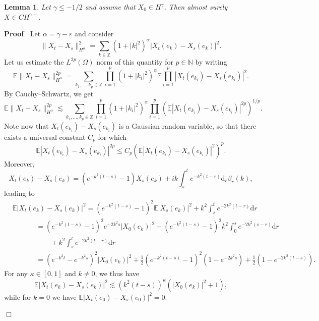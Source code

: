 \documentclass[a4paper,11pt]{article}
\newcommand{\mathd}{\mathrm{d}}
\newenvironment{proof}{\noindent\textbf{Proof\ }}{\hspace*{\fill}$\Box$\medskip}
\newtheorem{lemma}{Lemma}
{\theorembodyfont{\rmfamily}\newtheorem{remark}{Remark}}
\begin{document}
\begin{lemma}
  \label{lemma:ou-regularity}Let $\gamma \leqslant - 1 / 2$ and assume that
  $X_0 \in H^{\gamma}$. Then almost surely $X \in C H^{\gamma -}$.
\end{lemma}

\begin{proof}
  Let $\alpha = \gamma - \varepsilon$ and consider
  \[ \| X_t - X_s \|_{H^{\alpha}}^2 = \sum_{k \in \mathbb{Z}} (1 + | k
     |^2)^{\alpha} | X_t (e_k) - X_s (e_k) |^2 . \]
  Let us estimate the $L^{2 p} (\Omega)$ norm of this quantity for $p \in
  \mathbb{N}$ by writing
  \[ \mathbb{E} \| X_t - X_s \|_{H^{\alpha}}^{2 p} = \sum_{k_1, \ldots, k_p
     \in \mathbb{Z}} \prod_{i = 1}^p (1 + | k_i |^2)^{\alpha} \mathbb{E}
     \prod_{i = 1}^p | X_t (e_{k_i}) - X_s (e_{k_i}) |^2 . \]
  By Cauchy--Schwartz, we get
  \[ \mathbb{E} \| X_t - X_s \|_{H^{\alpha}}^{2 p} \lesssim \sum_{k_1,
     \ldots, k_p \in \mathbb{Z}} \prod_{i = 1}^p (1 + | k_i |^2)^{\alpha}
     \prod_{i = 1}^p (\mathbb{E} | X_t (e_{k_i}) - X_s (e_{k_i}) |^{2 p})^{1
     / p} . \]
  Note now that $X_t (e_{k_i}) - X_s (e_{k_i})$ is a Gaussian random variable,
  so that there exists a universal constant $C_p$ for which
  \[ \mathbb{E} | X_t (e_{k_i}) - X_s (e_{k_i}) |^{2 p} \leqslant C_p
     (\mathbb{E} | X_t (e_{k_i}) - X_s (e_{k_i}) |^2)^p . \]
  Moreover,
  \[ X_t (e_k) - X_s (e_k) = (e^{- k^2 (t - s)} - 1) X_s (e_k) + ik \int_s^t
     e^{- k^2 (t - r)} \mathd_r \beta_r (k), \]
  leading to
  \begin{align*}
     &\mathbb{E} | X_t (e_k) - X_s (e_k) |^2 = (e^{- k^2 (t - s)} - 1)^2 \mathbb{E} | X_s (e_k) |^2 + k^2 \int_s^t e^{- 2 k^2 (t - r)} \mathd r \\
     &\hspace{40pt} = (e^{- k^2 (t - s)} - 1)^2 e^{- 2 k^2 s} | X_0 (e_k) |^2 + (e^{- k^2 (t - s)} - 1)^2 k^2 \int_0^s e^{- 2 k^2 (s - r)} \mathd r  \\
     &\hspace{40pt} \qquad + k^2 \int_s^t e^{- 2 k^2 (t - r)} \mathd r \\
     &\hspace{40pt} = (e^{- k^2 t} - e^{- k^2 s})^2 | X_0 (e_k) |^2 + \frac{1}{2} (e^{- k^2 (t - s)} - 1)^2 (1 - e^{- 2 k^2 s}) + \frac{1}{2} (1 - e^{- 2 k^2 (t - s)}).
  \end{align*}
  For any $\kappa \in [0, 1]$ and $k \neq 0$, we thus have
  \[ \mathbb{E} | X_t (e_k) - X_s (e_k) |^2 \lesssim (k^2 (t - s))^{\kappa}
     (| X_0 (e_k) |^2 + 1), \]
  while for $k = 0$ we have $\mathbb{E} | X_t (e_0) - X_s (e_0) |^2 = 0$.

\end{proof}
\end{document}
